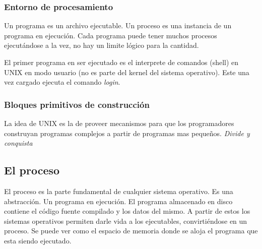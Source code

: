 \documentclass[titlepage,a4paper]{article}
\begin{document}
\subsubsection*{Entorno de procesamiento}
Un programa es un archivo ejecutable. Un proceso es una instancia de un programa en ejecución. Cada programa puede tener muchos procesos ejecutándose a la vez, no hay un limite lógico para la cantidad.

El primer programa en ser ejecutado es el interprete de comandos (shell) en UNIX en modo usuario (no es parte del kernel del sistema operativo). Este una vez cargado ejecuta el comando \textit{login}.

\subsubsection*{Bloques primitivos de construcción}
La idea de UNIX es la de proveer mecanismos para que los programadores construyan programas complejos a partir de programas mas pequeños. \textit{Divide y conquista}

\subsection*{El proceso}
El proceso es la parte fundamental de cualquier sistema operativo. Es una abstracción. Un programa en ejecución. El programa almacenado en disco contiene el código fuente compilado y los datos del mismo. A partir de estos los sistemas operativos permiten darle vida a los ejecutables, convirtiéndose en un proceso. Se puede ver como el espacio de memoria donde se aloja el programa que esta siendo ejecutado.

\end{document}
